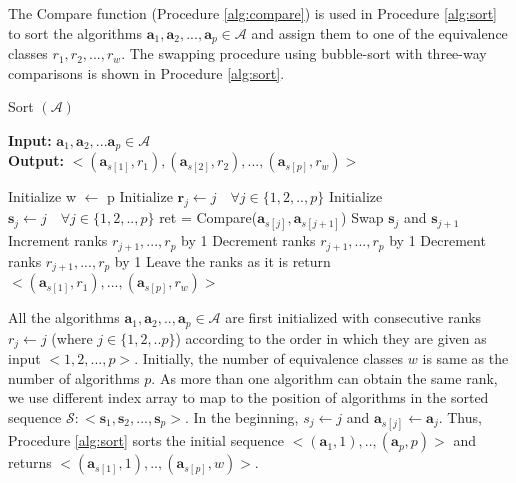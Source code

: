 \documentclass[conference]{IEEEtran}
\begin{document}
The Compare function (Procedure \ref{alg:compare}) is used in Procedure \ref{alg:sort} to sort the algorithms $\mathbf{a}_1,\mathbf{a}_2, ..., \mathbf{a}_p \in \mathcal{A}$ and assign them to one of the equivalence classes $r_1, r_2, ..., r_w$.
The swapping procedure using bubble-sort\cite{bubblesort} with three-way comparisons is shown in Procedure \ref{alg:sort}.
\begin{algorithm}
	\caption{Sort $(\mathcal{A})$ }
	\label{alg:sort}
	\hspace*{\algorithmicindent} \textbf{Input: } $ \mathbf{a}_1,\mathbf{a}_2,...\mathbf{a}_p \in \mathcal{A}$ \\
	\hspace*{\algorithmicindent} \textbf{Output: } $ < (\mathbf{a}_{s[1]},r_1), (\mathbf{a}_{s[2]}, r_2), ..., (\mathbf{a}_{s[p]},r_w) > $
	\begin{algorithmic}[1] 
		\State Initialize w $\leftarrow$ p
		\State Initialize $\mathbf{r}_j \leftarrow j \quad \forall j \in \{1,2,..,p\}$ 
		\State Initialize $\mathbf{s}_j \leftarrow j \quad \forall j \in \{1,2,..,p\}$ 
		\State ret = Compare($\mathbf{a}_{s[j]}, \mathbf{a}_{s[j+1]}$)
		\State Swap $\mathbf{s}_{j}$ and $\mathbf{s}_{j+1}$ \label{lst:swap}
		 \label{lst:h1}
		\State Increment ranks $r_{j+1}, ..., r_p$ by 1 \label{lst:h2}
		\EndIf
		\Else
		 \label{lst:gg1}
		\State Decrement ranks $r_{j+1}, ..., r_p$ by 1 \label{lst:gg2}
		\EndIf
		\EndIf
		 \label{lst:ag1}
		\State Decrement ranks $r_{j+1}, ..., r_p$ by 1 \label{lst:ag2}
		\EndIf
		\State Leave the ranks as it is
		\EndIf		
		\EndFor
		\EndFor
		\State return $< (\mathbf{a}_{s[1]},r_1), ..., (\mathbf{a}_{s[p]},r_w) >$
              \end{algorithmic}
\end{algorithm}
All the algorithms $\mathbf{a}_1, \mathbf{a}_2, .., \mathbf{a}_p \in \mathcal{A}$ are first initialized with consecutive ranks $r_j \leftarrow j$ (where $j \in\{1,2,..p\}$) according to the order in which they are given as input $<1,2,...,p> $. Initially, the number of equivalence classes $w$ is same as the number of algorithms $p$. As more than one algorithm can obtain the same rank, we use different index array to map to the position of algorithms in the sorted sequence $\mathcal{S} : < \mathbf{s}_1, \mathbf{s}_2, ..., \mathbf{s}_p >$. In the beginning, $s_j \leftarrow j$ and $ \mathbf{a}_{s[j]} \leftarrow \mathbf{a}_j$. Thus, Procedure \ref{alg:sort} sorts the initial sequence $< (\mathbf{a}_1,1), .., (\mathbf{a}_p,p) >$ and returns $< (\mathbf{a}_{s[1]},1), .., (\mathbf{a}_{s[p]},w) >$.
\end{document}
